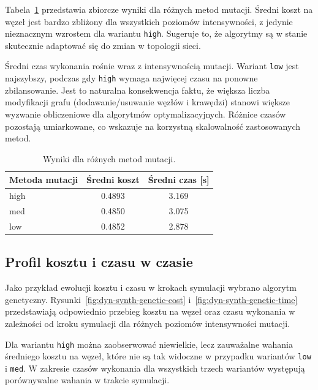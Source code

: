 Tabela~\ref{tab:dyn-synth-warm} przedstawia zbiorcze wyniki dla różnych metod mutacji. Średni koszt na węzeł jest bardzo zbliżony dla wszystkich poziomów intensywności, z jedynie nieznacznym wzrostem dla wariantu \texttt{high}. Sugeruje to, że algorytmy są w stanie skutecznie adaptować się do zmian w topologii sieci.

Średni czas wykonania rośnie wraz z intensywnością mutacji. Wariant \texttt{low} jest najszybszy, podczas gdy \texttt{high} wymaga najwięcej czasu na ponowne zbilansowanie. Jest to naturalna konsekwencja faktu, że większa liczba modyfikacji grafu (dodawanie/usuwanie węzłów i krawędzi) stanowi większe wyzwanie obliczeniowe dla algorytmów optymalizacyjnych. Różnice czasów pozostają umiarkowane, co wskazuje na korzystną skalowalność zastosowanych metod.

\begin{table}[H]
  \centering
  \caption{Wyniki dla różnych metod mutacji.}
  \label{tab:dyn-synth-warm}
  \begin{tabular}{lcc}
    \toprule
    \textbf{Metoda mutacji} & \textbf{Średni koszt} & \textbf{Średni czas [s]} \\
    \midrule
    high                    & 0.4893                & 3.169                    \\
    med                     & 0.4850                & 3.075                    \\
    low                     & 0.4852                & 2.878                    \\
    \bottomrule
  \end{tabular}
\end{table}

\subsection{Profil kosztu i czasu w czasie}
Jako przykład ewolucji kosztu i czasu w krokach symulacji wybrano algorytm genetyczny. Rysunki~\ref{fig:dyn-synth-genetic-cost} i~\ref{fig:dyn-synth-genetic-time} przedstawiają odpowiednio przebieg kosztu na węzeł oraz czasu wykonania w zależności od kroku symulacji dla różnych poziomów intensywności mutacji.

Dla wariantu \texttt{high} można zaobserwować niewielkie, lecz zauważalne wahania średniego kosztu na węzeł, które nie są tak widoczne w przypadku wariantów \texttt{low} i \texttt{med}. W zakresie czasów wykonania dla wszystkich trzech wariantów występują porównywalne wahania w trakcie symulacji.

